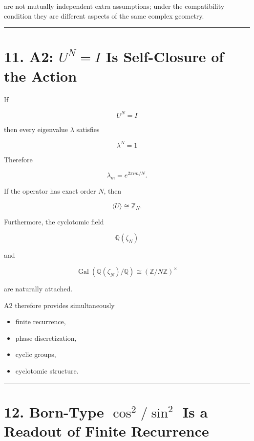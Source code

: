 \documentclass[
  a4paper,
]{article}
\providecommand{\tightlist}{%
  \setlength{\itemsep}{0pt}\setlength{\parskip}{0pt}}
\begin{document}
are not mutually independent extra assumptions; under the compatibility
condition they are different aspects of the same complex geometry.

\begin{center}\rule{0.5\linewidth}{0.5pt}\end{center}

\section{\texorpdfstring{11. A2: \(U^N=I\) Is Self-Closure of the
Action}{11. A2: U\^{}N=I Is Self-Closure of the Action}}\label{a2-uni-is-self-closure-of-the-action}

If

\[
\boxed{
U^N=I
}
\]

then every eigenvalue \(\lambda\) satisfies

\[
\lambda^N=1
\]

Therefore

\[
\boxed{
\lambda_m=e^{2\pi i m/N}
}.
\]

If the operator has exact order \(N\), then

\[
\boxed{
\langle U\rangle\cong\mathbb Z_N
}.
\]

Furthermore, the cyclotomic field

\[
\mathbb Q(\zeta_N)
\]

and

\[
\operatorname{Gal}
(\mathbb Q(\zeta_N)/\mathbb Q)
\cong
(\mathbb Z/N\mathbb Z)^\times
\]

are naturally attached.

A2 therefore provides simultaneously

\begin{itemize}
\tightlist
\item
  finite recurrence,
\item
  phase discretization,
\item
  cyclic groups,
\item
  cyclotomic structure.
\end{itemize}

\begin{center}\rule{0.5\linewidth}{0.5pt}\end{center}

\section{\texorpdfstring{12. Born-Type \(\cos^2/\sin^2\) Is a Readout of
Finite
Recurrence}{12. Born-Type \textbackslash cos\^{}2/\textbackslash sin\^{}2 Is a Readout of Finite Recurrence}}\label{born-type-cos2sin2-is-a-readout-of-finite-recurrence}
\end{document}
